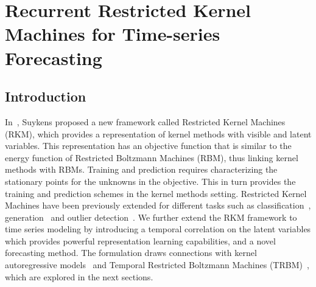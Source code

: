 \chapter{Recurrent Restricted Kernel Machines for Time-series Forecasting}\label{cha:rrkm}

\section{Introduction}
In~\cite{suykensdeep2017}, Suykens proposed a new framework called Restricted Kernel Machines (RKM), which provides a representation of kernel methods with visible and latent variables. This representation has an objective function that is similar to the energy function of Restricted Boltzmann Machines (RBM), thus linking kernel methods with RBMs.
Training and prediction requires characterizing the stationary points for the unknowns in the objective. This in turn provides the training and prediction schemes in the kernel methods setting.
Restricted Kernel Machines have been previously extended for different tasks such as classification~\cite{suykensdeep2017}, generation~\cite{GENRKM, st_rkm} and outlier detection~\cite{TONIN2021661}.
We further extend the RKM framework to time series modeling by introducing a temporal correlation on the latent variables which provides powerful representation learning capabilities, and a novel forecasting method. The formulation draws connections with kernel autoregressive models~\cite{KALLAS20133053} and Temporal Restricted Boltzmann Machines (TRBM)~\cite{sutskeverRecurrentTemporalRestricted,osogamiBoltzmannMachinesTimeseries2019}, which are explored in the next sections.






